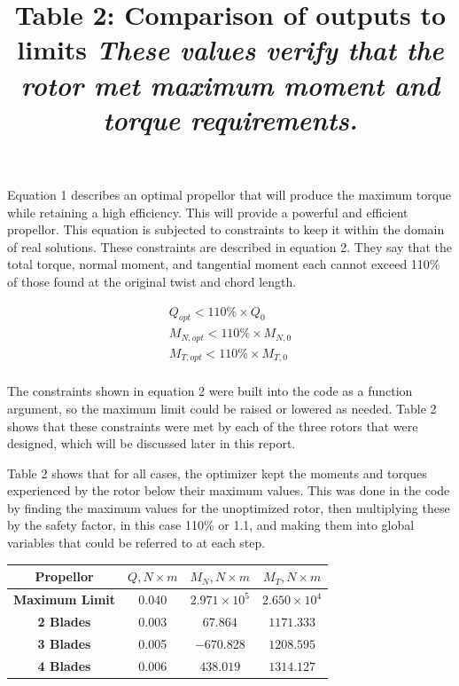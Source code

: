 \documentclass{article}
\begin{document}
\raggedright

Equation 1 describes an optimal propellor that will produce the maximum torque while retaining a high efficiency. This will provide a powerful and efficient propellor. This equation is subjected to constraints to keep it within the domain of real solutions. These constraints are described in equation 2. They say that the total torque, normal moment, and tangential moment each cannot exceed 110\% of those found at the original twist and chord length. \newline

\begin{equation}
\begin{aligned}
	Q_{opt} < 110\% \times Q_{0} \\
	M_{N,opt} < 110\% \times M_{N,0} \\
	M_{T,opt} < 110\% \times M_{T,0} \\
\end{aligned}
\end{equation} \newline

The constraints shown in equation 2 were built into the code as a function argument, so the maximum limit could be raised or lowered as needed. Table 2 shows that these constraints were met by each of the three rotors that were designed, which will be discussed later in this report. \newline

Table 2 shows that for all cases, the optimizer kept the moments and torques experienced by the rotor below their maximum values. This was done in the code by finding the maximum values for the unoptimized rotor, then multiplying these by the safety factor, in this case 110\% or 1.1, and making them into global variables that could be referred to at each step. \newline

\centering
\title{Table 2: Comparison of outputs to limits \newline}
\title{\emph{These values verify that the rotor met maximum moment and torque requirements.}} \label{table:2} \newline
\begin{tabular}{| c | c | c | c |}
	 \hline
  	 \textbf{Propellor} & \textbf{$Q, N \times m$} & \textbf{$M_{N}, N \times m$} & \textbf{$M_{T}, N \times m$} \\ \hline
	 \textbf{Maximum Limit} & 0.040 & $2.971 \times 10^{5}$ & $2.650 \times 10^{4}$ \\
	 \textbf{2 Blades} & 0.003 & $67.864$ & $1171.333$ \\
	 \textbf{3 Blades} & 0.005 & $-670.828$ & $1208.595$ \\
	 \textbf{4 Blades} & 0.006 & $438.019$ & $1314.127$ \\ \hline
\end{tabular} \break \newline
\end{document}
